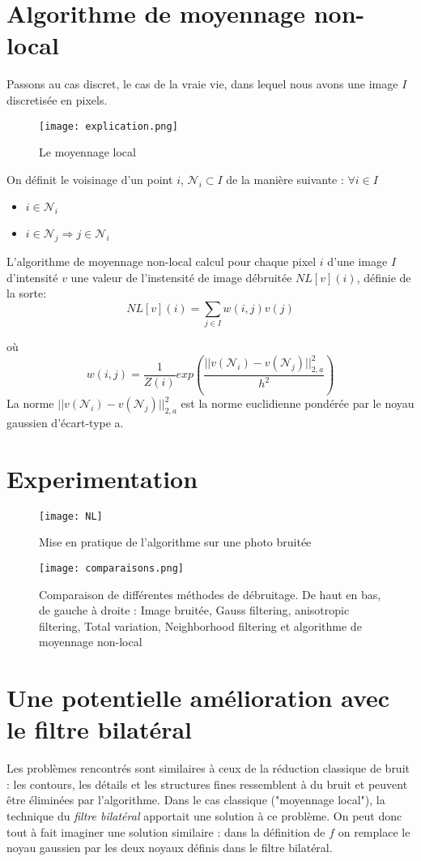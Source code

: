 \documentclass{article}
\begin{document}
\section{Algorithme de moyennage non-local}
Passons au cas discret, le cas de la vraie vie, dans lequel nous avons une image $I$ discretisée en pixels.\\
\begin{figure}[h!]
    \centering
    \texttt{[image: explication.png]}
    \caption{Le moyennage local}
\end{figure}
\newpage
On définit le voisinage d'un point $i$, $\mathcal{N}_i \subset I$ de la manière suivante : $\forall i \in I  $
\begin{itemize}
    \item $i \in \mathcal{N}_i$
    \item $i \in \mathcal{N}_j\Rightarrow j \in \mathcal{N}_i$
\end{itemize}
L'algorithme de moyennage non-local calcul pour chaque pixel $i$ d'une image $I$ d'intensité $v$ une valeur de l'instensité de image débruitée $NL[v](i)$, définie de la sorte:
$$NL[v](i) = \sum_{j \in I} w(i,j)v(j)$$

où $$w(i,j) = \frac{1}{Z(i)}exp(\frac{||v(\mathcal{N}_i)-v(\mathcal{N}_{j})||_{2,a}^{2}}{h^{2}})$$
La norme $||v(\mathcal{N}_{i})-v(\mathcal{N}_j)||_{2,a}^{2}$ est la norme euclidienne pondérée par le noyau gaussien d'écart-type a.



\section{Experimentation}

\begin{figure}[ht!]
    \centering
    \texttt{[image: NL]}
    \caption{Mise en pratique de l'algorithme sur une photo bruitée}
\end{figure}

\begin{figure}[ht!]
    \centering
    \texttt{[image: comparaisons.png]}
    \caption{Comparaison de différentes méthodes de débruitage. De haut en bas, de gauche à droite : Image bruitée, Gauss filtering, anisotropic filtering, Total variation, Neighborhood filtering et algorithme de moyennage non-local}
\end{figure}

\section{Une potentielle amélioration avec le filtre bilatéral}
Les problèmes rencontrés sont similaires à ceux de la réduction classique de bruit : les contours, les détails et les structures fines ressemblent à du bruit et peuvent être éliminées par l'algorithme. Dans le cas classique ("moyennage local"), la technique du \textit{filtre bilatéral} apportait une solution à ce problème. On peut donc tout à fait imaginer une solution similaire : dans la définition de $f$ on remplace le noyau gaussien par les deux noyaux définis dans le filtre bilatéral.  
\end{document}
